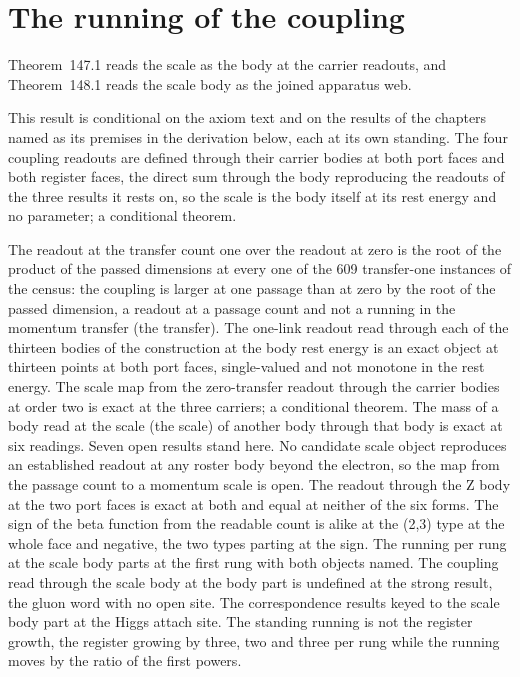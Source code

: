 \section{The running of the coupling}\label{mod:V-7-running-of-the-coupling}
\label{narr:open:5-7}Theorem~147.1 reads the scale as the body at the carrier readouts, and Theorem~148.1 reads the scale body as the joined apparatus web.
\begin{chconditional}\label{box:V-7-running-of-the-coupling:1}
This result is conditional on the axiom text and on the results of the chapters named as its premises in the derivation below, each at its own standing.
The four coupling readouts are defined through their carrier bodies at both port faces and both register faces, the direct sum through the body reproducing the readouts of the three results it rests on, so the scale is the body itself at its rest energy and no parameter; a conditional theorem.
\end{chconditional}
The readout at the transfer count one over the readout at zero is the root of the product of the passed dimensions at every one of the 609 transfer-one instances of the census: the coupling is larger at one passage than at zero by the root of the passed dimension, a readout at a passage count and not a running in the momentum transfer (the transfer).
The one-link readout read through each of the thirteen bodies of the construction at the body rest energy is an exact object at thirteen points at both port faces, single-valued and not monotone in the rest energy.
The scale map from the zero-transfer readout through the carrier bodies at order two is exact at the three carriers; a conditional theorem. The mass of a body read at the scale (the scale) of another body through that body is exact at six readings.
Seven open results stand here. No candidate scale object reproduces an established readout at any roster body beyond the electron, so the map from the passage count to a momentum scale is open. The readout through the Z body at the two port faces is exact at both and equal at neither of the six forms. The sign of the beta function from the readable count is alike at the (2,3) type at the whole face and negative, the two types parting at the sign. The running per rung at the scale body parts at the first rung with both objects named. The coupling read through the scale body at the body part is undefined at the strong result, the gluon word with no open site. The correspondence results keyed to the scale body part at the Higgs attach site. The standing running is not the register growth, the register growing by three, two and three per rung while the running moves by the ratio of the first powers.
